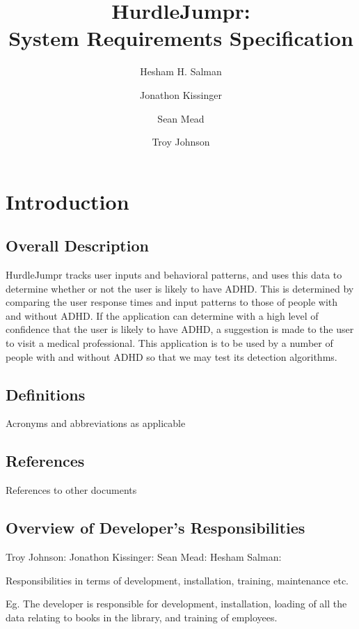 \documentclass[a4wide]{article}
\title{HurdleJumpr:\\ System Requirements Specification}
\author{Hesham H. Salman \and Jonathon Kissinger \and Sean Mead \and Troy Johnson}
\begin{document}
\maketitle

\section{Introduction}

\subsection{Overall Description}

HurdleJumpr tracks user inputs and behavioral patterns, and uses this data to determine whether or not the user is likely to have ADHD. This is determined by comparing the user response times and input patterns to those of people with and without ADHD. If the application can determine with a high level of confidence that the user is likely to have ADHD, a suggestion is made to the user to visit a medical professional. \newline \newline
This application is to be used by a number of people with and without ADHD so that we may test its detection algorithms.

\subsection{Definitions}

Acronyms and abbreviations as applicable

\subsection{References}

References to other documents

\subsection{Overview of Developer's Responsibilities}


Troy Johnson:
Jonathon Kissinger:
Sean Mead:
Hesham Salman:

Responsibilities in terms of development, installation, training, maintenance
etc.

Eg. The developer is responsible for development, installation,
loading of all the data relating to books in the library,
and training of employees.
\end{document}
